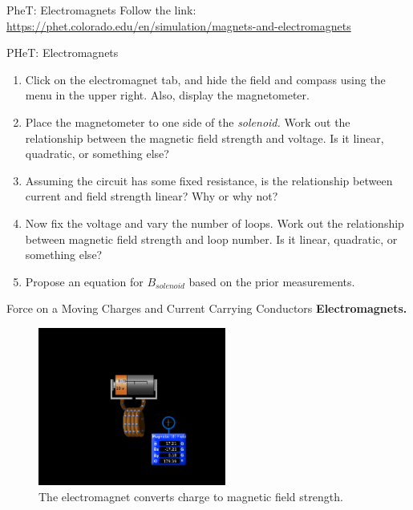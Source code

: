 \documentclass{beamer}
\begin{document}
\begin{frame}{PheT: Electromagnets}
Follow the link: \\ \vspace{0.5cm}
\url{https://phet.colorado.edu/en/simulation/magnets-and-electromagnets}
\end{frame}

\begin{frame}{PHeT: Electromagnets}
\small
\begin{enumerate}
\item Click on the electromagnet tab, and hide the field and compass using the menu in the upper right.  Also, display the magnetometer.
\item Place the magnetometer to one side of the \textit{solenoid.}  Work out the relationship between the magnetic field strength and voltage.  Is it linear, quadratic, or something else?
\item Assuming the circuit has some fixed resistance, is the relationship between current and field strength linear?  Why or why not?
\item Now fix the voltage and vary the number of loops.  Work out the relationship between magnetic field strength and loop number.  Is it linear, quadratic, or something else?
\item Propose an equation for $B_{solenoid}$ based on the prior measurements.
\end{enumerate}
\end{frame}

\begin{frame}{Force on a Moving Charges and Current Carrying Conductors}
\textbf{Electromagnets.}
\begin{figure}
\centering
\includegraphics[width=0.55\textwidth]{figures/phetemmag.png}
\caption{\label{fig:phetemmag} The electromagnet converts charge to magnetic field strength.}
\end{figure}
\end{frame}
\end{document}

